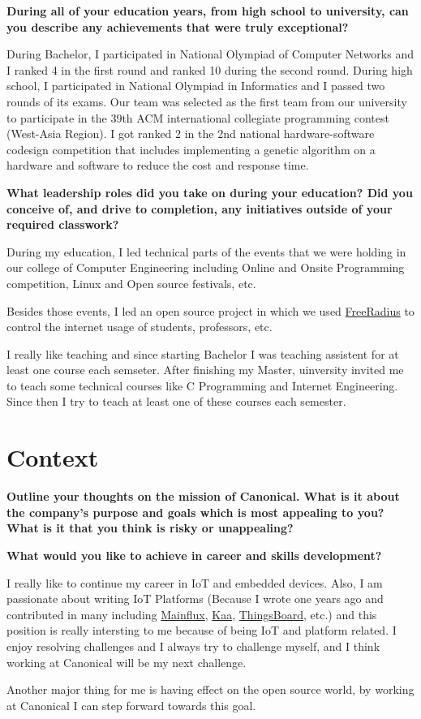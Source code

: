 \noindent
\textbf{During all of your education years, from high school to university, can you describe any achievements that were truly exceptional?}

During Bachelor, I participated in National Olympiad of Computer Networks and I ranked 4 in the first round and ranked
10 during the second round.
During high school, I participated in National Olympiad in Informatics and I passed two rounds of its exams.
Our team was selected as the first team from our university to participate in the 39th ACM international collegiate
programming contest (West-Asia Region).
I got ranked 2 in the 2nd national hardware-software codesign competition that includes implementing a genetic algorithm
on a hardware and software to reduce the cost and response time.

\noindent
\textbf{What leadership roles did you take on during your education?
Did you conceive of, and drive to completion, any initiatives outside of your required classwork?}

During my education, I led technical parts of the events that we were holding in our college of Computer Engineering including
Online and Onsite Programming competition, Linux and Open source festivals, etc.

Besides those events, I led an open source project in which we used \href{https://freeradius.org/}{FreeRadius}
to control the internet usage of students, professors, etc.

I really like teaching and since starting Bachelor I was teaching assistent for at least one course each semseter.
After finishing my Master, uinversity invited me to teach some technical courses like C Programming and
Internet Engineering. Since then I try to teach at least one of these courses each semester.

\section{Context}

\noindent
\textbf{Outline your thoughts on the mission of Canonical. What is it about the company's purpose and goals which is most appealing to you?
What is it that you think is risky or unappealing?}

\noindent
\textbf{What would you like to achieve in career and skills development?}

I really like to continue my career in IoT and embedded devices. Also, I am passionate about writing IoT Platforms
(Because I wrote one years ago and contributed in many including \href{https://github.com/mainflux}{Mainflux},
\href{https://github.com/kaaproject}{Kaa}, \href{https://github.com/thingsboard}{ThingsBoard}, etc.)
and this position is really intersting to me because of being IoT and platform related.
I enjoy resolving challenges and I always try to challenge myself, and I think working at Canonical will be my next challenge.

Another major thing for me is having effect on the open source world, by working at Canonical I can
step forward towards this goal.
